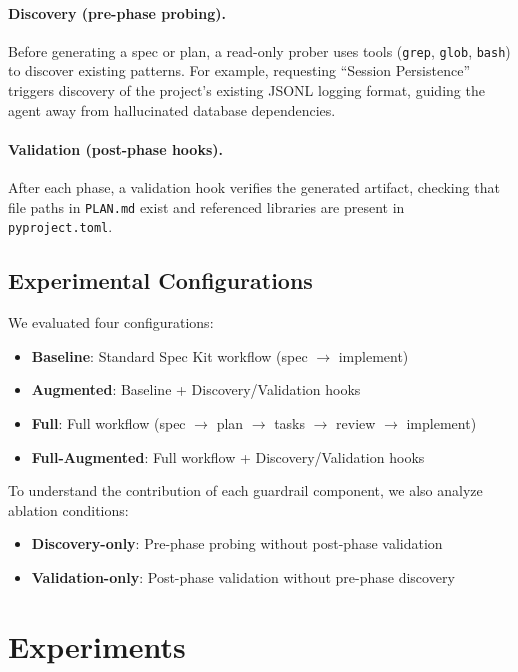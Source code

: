 \documentclass[sigconf,anonymous,review]{acmart}
\begin{document}
\paragraph{Discovery (pre-phase probing).} Before generating a spec or plan, a read-only prober uses tools (\texttt{grep}, \texttt{glob}, \texttt{bash}) to discover existing patterns. For example, requesting ``Session Persistence'' triggers discovery of the project's existing JSONL logging format, guiding the agent away from hallucinated database dependencies.

\paragraph{Validation (post-phase hooks).} After each phase, a validation hook verifies the generated artifact, checking that file paths in \texttt{PLAN.md} exist and referenced libraries are present in \texttt{pyproject.toml}.

\subsection{Experimental Configurations}

We evaluated four configurations:

\begin{itemize}
  \item \textbf{Baseline}: Standard Spec Kit workflow (spec $\rightarrow$ implement)
  \item \textbf{Augmented}: Baseline + Discovery/Validation hooks
  \item \textbf{Full}: Full workflow (spec $\rightarrow$ plan $\rightarrow$ tasks $\rightarrow$ review $\rightarrow$ implement)
  \item \textbf{Full-Augmented}: Full workflow + Discovery/Validation hooks
\end{itemize}

To understand the contribution of each guardrail component, we also analyze ablation conditions:
\begin{itemize}
  \item \textbf{Discovery-only}: Pre-phase probing without post-phase validation
  \item \textbf{Validation-only}: Post-phase validation without pre-phase discovery
\end{itemize}


\section{Experiments}
\end{document}

